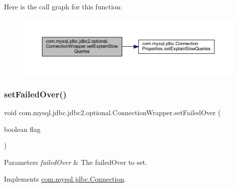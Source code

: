 Here is the call graph for this function\+:
\nopagebreak
\begin{figure}[H]
\begin{center}
\leavevmode
\includegraphics[width=350pt]{classcom_1_1mysql_1_1jdbc_1_1jdbc2_1_1optional_1_1_connection_wrapper_a87b59ff60acc2b82007b597ca7c56799_cgraph}
\end{center}
\end{figure}
\mbox{\label{classcom_1_1mysql_1_1jdbc_1_1jdbc2_1_1optional_1_1_connection_wrapper_a5ca644a1dbabdfa779153552d47fc826}} 
\subsubsection{\texorpdfstring{set\+Failed\+Over()}{setFailedOver()}}
{\footnotesize\ttfamily void com.\+mysql.\+jdbc.\+jdbc2.\+optional.\+Connection\+Wrapper.\+set\+Failed\+Over (\begin{DoxyParamCaption}\item[{boolean}]{flag }\end{DoxyParamCaption})}


\begin{DoxyParams}{Parameters}
{\em failed\+Over} & The failed\+Over to set. \\
\hline
\end{DoxyParams}


Implements \mbox{\hyperlink{interfacecom_1_1mysql_1_1jdbc_1_1_connection_af1a58f95720963635270b83f16d558b0}{com.\+mysql.\+jdbc.\+Connection}}.

